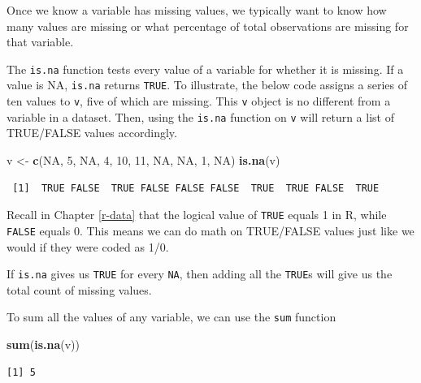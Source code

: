 \documentclass[
]{book}
\makeatletter
\newenvironment{Shaded}{\begin{snugshade}}{\end{snugshade}}
\newcommand{\ConstantTok}[1]{\textcolor[rgb]{0.37,0.37,0.37}{#1}}
\newcommand{\DecValTok}[1]{\textcolor[rgb]{0.06,0.06,0.06}{#1}}
\newcommand{\FunctionTok}[1]{\textcolor[rgb]{0.27,0.27,0.27}{\textbf{#1}}}
\newcommand{\NormalTok}[1]{#1}
\newcommand{\OtherTok}[1]{\textcolor[rgb]{0.37,0.37,0.37}{#1}}
\newenvironment{kframe}{%
\medskip{}
\setlength{\fboxsep}{.8em}
 \def\at@end@of@kframe{}%
 \ifinner\ifhmode%
  \def\at@end@of@kframe{\end{minipage}}%
  \begin{minipage}{\columnwidth}%
 \fi\fi%
 \def\FrameCommand##1{\hskip\@totalleftmargin \hskip-\fboxsep
 \colorbox{shadecolor}{##1}\hskip-\fboxsep
     \hskip-\linewidth \hskip-\@totalleftmargin \hskip\columnwidth}%
 \MakeFramed {\advance\hsize-\width
   \@totalleftmargin\z@ \linewidth\hsize
   \@setminipage}}%
 {\par\unskip\endMakeFramed%
 \at@end@of@kframe}
\renewenvironment{Shaded}{\begin{kframe}}{\end{kframe}}
\makeatother
\begin{document}
Once we know a variable has missing values, we typically want to know how many values are missing or what percentage of total observations are missing for that variable.

The \texttt{is.na} function tests every value of a variable for whether it is missing. If a value is NA, \texttt{is.na} returns \texttt{TRUE}. To illustrate, the below code assigns a series of ten values to \texttt{v}, five of which are missing. This \texttt{v} object is no different from a variable in a dataset. Then, using the \texttt{is.na} function on \texttt{v} will return a list of TRUE/FALSE values accordingly.

\begin{Shaded}
\begin{Highlighting}[]
\NormalTok{v }\OtherTok{\textless{}{-}} \FunctionTok{c}\NormalTok{(}\ConstantTok{NA}\NormalTok{, }\DecValTok{5}\NormalTok{, }\ConstantTok{NA}\NormalTok{, }\DecValTok{4}\NormalTok{, }\DecValTok{10}\NormalTok{, }\DecValTok{11}\NormalTok{, }\ConstantTok{NA}\NormalTok{, }\ConstantTok{NA}\NormalTok{, }\DecValTok{1}\NormalTok{, }\ConstantTok{NA}\NormalTok{)}
\FunctionTok{is.na}\NormalTok{(v)}
\end{Highlighting}
\end{Shaded}

\begin{verbatim}
 [1]  TRUE FALSE  TRUE FALSE FALSE FALSE  TRUE  TRUE FALSE  TRUE
\end{verbatim}

Recall in Chapter \ref{r-data} that the logical value of \texttt{TRUE} equals 1 in R, while \texttt{FALSE} equals 0. This means we can do math on TRUE/FALSE values just like we would if they were coded as 1/0.

If \texttt{is.na} gives us \texttt{TRUE} for every \texttt{NA}, then adding all the \texttt{TRUE}s will give us the total count of missing values.

To sum all the values of any variable, we can use the \texttt{sum} function

\begin{Shaded}
\begin{Highlighting}[]
\FunctionTok{sum}\NormalTok{(}\FunctionTok{is.na}\NormalTok{(v))}
\end{Highlighting}
\end{Shaded}

\begin{verbatim}
[1] 5
\end{verbatim}
\end{document}
